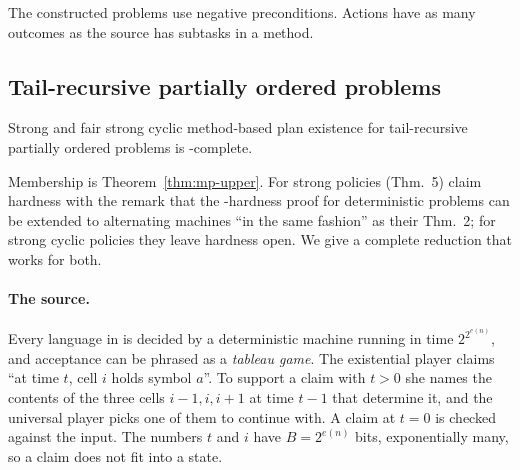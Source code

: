 The constructed problems use negative preconditions. Actions have as many outcomes as the source
has subtasks in a method.

\subsection{Tail-recursive partially ordered problems}\label{sec:tr-po}

\begin{theorem}\label{thm:tr-po}
  Strong and fair strong cyclic method-based plan existence for tail-recursive partially ordered
  problems is \TWOEXP-complete.
\end{theorem}

Membership is Theorem~\ref{thm:mp-upper}. For strong policies \CBb{} (Thm.~5) claim hardness with
the remark that the \EXPSPACE-hardness proof for deterministic problems can be extended to
alternating machines ``in the same fashion'' as their Thm.~2; for strong cyclic policies they leave
hardness open. We give a complete reduction that works for both.

\paragraph{The source.} Every language in \TWOEXP{} is decided by a deterministic machine running in
time $2^{2^{e(n)}}$, and acceptance can be phrased as a \emph{tableau game}. The existential player
claims ``at time $t$, cell $i$ holds symbol $a$''. To support a claim with $t>0$ she names the
contents of the three cells $i-1,i,i+1$ at time $t-1$ that determine it, and the universal player
picks one of them to continue with. A claim at $t=0$ is checked against the input. The numbers
$t$ and $i$ have $B=2^{e(n)}$ bits, exponentially many, so a claim does not fit into a state.

